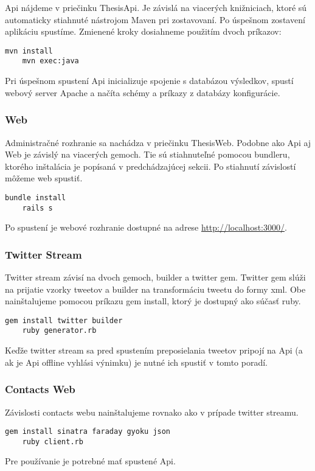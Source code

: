 	Api nájdeme v priečinku ThesisApi. Je závislá na viacerých knižniciach, ktoré sú automaticky stiahnuté nástrojom Maven pri zostavovaní. Po úspešnom zostavení aplikáciu spustíme. Zmienené kroky dosiahneme použitím dvoch príkazov:
	\begin{lstlisting}[label=lst:runapi,caption=Spustenie serverovej časti aplikácie]
	mvn install
	mvn exec:java
	\end{lstlisting}
	Pri úspešnom spustení Api inicializuje spojenie s databázou výsledkov, spustí webový server Apache a načíta schémy a príkazy z databázy konfigurácie.
	
\subsubsection{Web}
	Administračné rozhranie sa nachádza v priečinku ThesisWeb. Podobne ako Api aj Web je závislý na viacerých gemoch. Tie sú stiahnuteľné pomocou bundleru, ktorého inštalácia je popísaná v predchádzajúcej sekcii. Po stiahnutí závislostí môžeme web spustiť.
	\begin{lstlisting}[label=lst:runweb,caption=Spustenie administračného rozhrania]
	bundle install
	rails s
	\end{lstlisting}
	Po spustení je webové rozhranie dostupné na adrese \url{http://localhost:3000/}.
		
\subsubsection{Twitter Stream}
	Twitter stream závisí na dvoch gemoch, builder a twitter gem. Twitter gem slúži na prijatie vzorky tweetov a builder na transformáciu tweetu do formy xml. Obe nainštalujeme pomocou príkazu gem install, ktorý je dostupný ako súčasť ruby.
	\begin{lstlisting}[label=lst:uctwitter,caption=Spustenie vzorového streamu udalostí]
	gem install twitter builder
	ruby generator.rb
	\end{lstlisting}
	Keďže twitter stream sa pred spustením preposielania tweetov pripojí na Api (a ak je Api offline vyhlási výnimku) je nutné ich spustiť v tomto poradí.
	
\subsubsection{Contacts Web}
	Závislosti contacts webu nainštalujeme rovnako ako v prípade twitter streamu.		
	\begin{lstlisting}[label=lst:ucweb,caption=Spustenie vzorovej webovej aplikácie]
	gem install sinatra faraday gyoku json
	ruby client.rb
	\end{lstlisting}
	Pre používanie je potrebné mať spustené Api.

